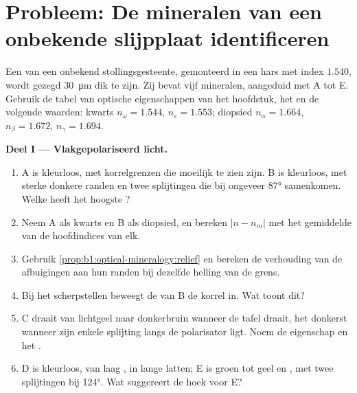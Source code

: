 \section{Probleem: De mineralen van een onbekende slijpplaat identificeren}

\begin{problem}
\label{pb:b1:optical-mineralogy:1}
Een  van een onbekend stollingsgesteente, gemonteerd in een hars met index $1.540$, wordt gezegd \qty{30}{\micro m} dik te zijn.
Zij bevat vijf mineralen, aangeduid met A tot E. Gebruik de tabel van optische eigenschappen van het hoofdstuk, het  en de
volgende waarden: kwarts $n_\omega = 1.544$, $n_\varepsilon = 1.553$; diopsied $n_\alpha = 1.664$, $n_\beta = 1.672$, $n_\gamma = 1.694$.

\medskip
\noindent\textbf{Deel I --- Vlakgepolariseerd licht.}
\begin{enumerate}
  \item {} A is kleurloos, met korrelgrenzen die moeilijk te zien zijn.  B is kleurloos, met sterke donkere randen en
        twee splijtingen die bij ongeveer \ang{87} samenkomen. Welke heeft het hoogste ?
  \item Neem A als kwarts en B als diopsied, en bereken $|n - n_m|$ met het gemiddelde van de hoofdindices van elk.
  \item Gebruik \cref{prop:b1:optical-mineralogy:relief} en bereken de verhouding van de afbuigingen aan hun randen bij
        dezelfde helling van de grens.
  \item Bij het scherpstellen beweegt de  van B de korrel in. Wat toont dit?
  \item {} C draait van lichtgeel naar donkerbruin wanneer de tafel draait, het donkerst wanneer zijn enkele splijting langs
        de polarisator ligt. Noem de eigenschap en het .
  \item {} D is kleurloos, van laag , in lange latten; E is groen tot geel en , met twee splijtingen bij
        \ang{124}. Wat suggereert de hoek voor E?
\end{enumerate}


\end{problem}
